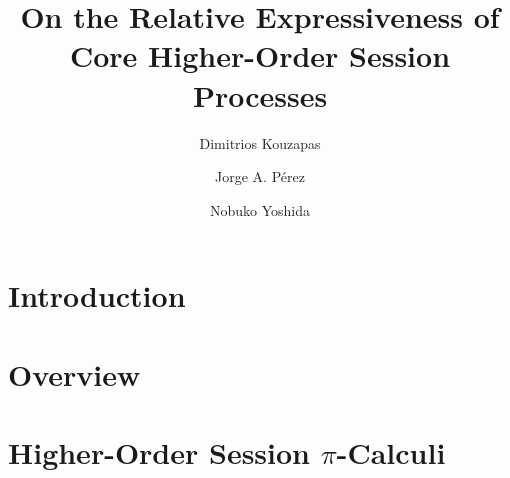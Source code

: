 \documentclass{llncs}
\begin{document}



\title{On the Relative Expressiveness of \\ Core Higher-Order Session Processes}

\author{
	Dimitrios Kouzapas%
	\and
	Jorge A. P\'{e}rez
	\and Nobuko Yoshida
}
\maketitle









%

%

\section{Introduction}
\label{sec:intro}


\section{Overview} %
%

\section{Higher-Order Session $\pi$-Calculi}
\label{sec:calculus}

\end{document}
